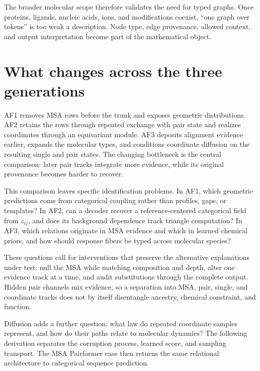 The broader molecular scope therefore validates the need for typed graphs.  Once proteins,
ligands, nucleic acids, ions, and modifications coexist, ``one graph over tokens'' is too weak a
description.  Node type, edge provenance, allowed context, and output interpretation become part
of the mathematical object.

\section{What changes across the three generations}

AF1 removes MSA rows before the trunk and exposes geometric distributions.  AF2 retains the rows
through repeated exchange with pair state and realizes coordinates through an equivariant module.
AF3 deposits alignment evidence earlier, expands the molecular types, and conditions coordinate
diffusion on the resulting single and pair states.  The changing bottleneck is the central
comparison: later pair tracks integrate more evidence, while its original provenance becomes
harder to recover.

This comparison leaves specific identification problems.  In AF1, which geometric predictions
come from categorical coupling rather than profiles, gaps, or templates?  In AF2, can a decoder
recover a reference-centered categorical field from $z_{ij}$, and does its background dependence
track triangle computation?  In AF3, which relations originate in MSA evidence and which in learned
chemical priors, and how should response fibers be typed across molecular species?

These questions call for interventions that preserve the alternative explanations under test:
null the MSA while matching composition and depth, alter one evidence track at a time, and audit
substitutions through the complete output.  Hidden pair channels mix evidence, so a separation
into MSA, pair, single, and coordinate tracks does not by itself disentangle ancestry, chemical
constraint, and function.

Diffusion adds a further question: what law do repeated coordinate samples represent, and how do
their paths relate to molecular dynamics?  The following derivation separates the corruption
process, learned score, and sampling transport.  The MSA Pairformer case then returns the same
relational architecture to categorical sequence prediction.
